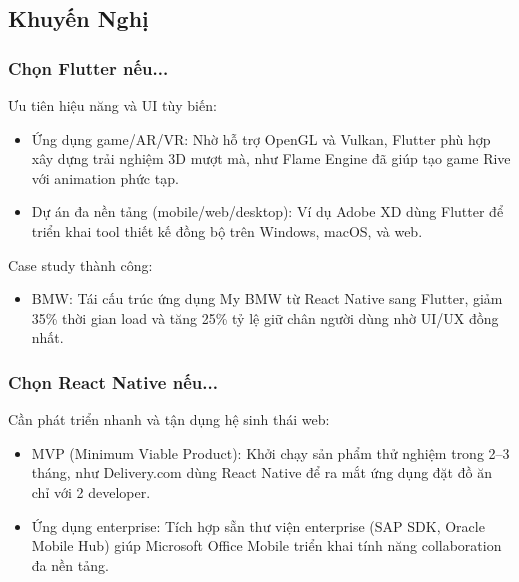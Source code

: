 \subsection{Khuyến Nghị}
\renewcommand{\labelitemi}{--}    
\subsubsection{Chọn Flutter nếu...}
\begin{flushleft}
  \hspace*{0.8cm}Ưu tiên hiệu năng và UI tùy biến:
  \setlength{\leftmargini}{1.5cm}
  \begin{itemize}
    \item Ứng dụng game/AR/VR: Nhờ hỗ trợ OpenGL và Vulkan, Flutter phù hợp xây dựng trải nghiệm 3D mượt mà, như Flame Engine đã giúp tạo game Rive với animation phức tạp.
    \item Dự án đa nền tảng (mobile/web/desktop): Ví dụ Adobe XD dùng Flutter để triển khai tool thiết kế đồng bộ trên Windows, macOS, và web.
  \end{itemize}
\end{flushleft}

\begin{flushleft}
  \hspace*{0.8cm}Case study thành công:
  \setlength{\leftmargini}{1.5cm}
  \begin{itemize}
      \item BMW: Tái cấu trúc ứng dụng My BMW từ React Native sang Flutter, giảm 35\% thời gian load và tăng 25\% tỷ lệ giữ chân người dùng nhờ UI/UX đồng nhất.
  \end{itemize}
\end{flushleft}

\subsubsection{Chọn React Native nếu...}
    \begin{flushleft}
      \hspace*{0.8cm}Cần phát triển nhanh và tận dụng hệ sinh thái web:
      \setlength{\leftmargini}{1.5cm}
      \begin{itemize}
        \item MVP (Minimum Viable Product): Khởi chạy sản phẩm thử nghiệm trong 2–3 tháng, như Delivery.com dùng React Native để ra mắt ứng dụng đặt đồ ăn chỉ với 2 developer.
        \item Ứng dụng enterprise: Tích hợp sẵn thư viện enterprise (SAP SDK, Oracle Mobile Hub) giúp Microsoft Office Mobile triển khai tính năng collaboration đa nền tảng.
      \end{itemize}
    \end{flushleft}

